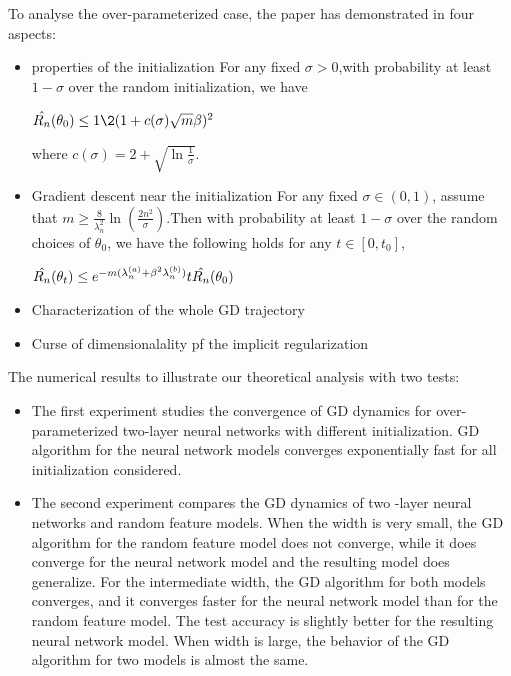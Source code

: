 \documentclass{article}
\begin{document}
To analyse the over-parameterized case, the paper has demonstrated in four aspects:
\begin{itemize}
\item properties of the initialization 
For any fixed $\sigma > 0$,with probability at least $1-\sigma$ over the random initialization, we have
    \begin{center}
      $\Hat{R_n}(\theta_0)\leq {1\2}(1+c(\sigma)\sqrt{m}\beta)^2$
    \end{center}
where $c(\sigma) = 2+\sqrt{\ln{\frac{1}{\sigma}}}$.

\item Gradient descent near the initialization 
For any fixed $\sigma \in (0,1)$, assume that $m \geq \frac{8}{\lambda_n^2}\ln(\frac{2n^2}{\sigma})$.Then with probability at least $1-\sigma$ over the random choices of $\theta_0$, we have the following holds for any $t\in[0,t_0]$,
    \begin{center}
      $\Hat{R_n}(\theta_t)\leq e^{-m(\lambda_n^{(a)}+\beta^2\lambda_n^{(b)})}t\Hat{R_n}(\theta_0)$
    \end{center}
    
\item Characterization of the whole GD trajectory
\item Curse of dimensionalality pf the implicit regularization
\end{itemize}

The numerical results to illustrate our theoretical analysis with two tests: 
\begin{itemize}
\item The first experiment studies the convergence of GD dynamics for over-parameterized two-layer neural networks with different initialization. GD algorithm for the neural network models converges exponentially fast for all initialization considered.
\item The second experiment compares the GD dynamics of two -layer neural networks and random feature models. When the width is very small, the GD algorithm for the random feature model does not converge, while it does converge for the neural network model and the resulting model does generalize. For the intermediate width, the GD algorithm for both models converges, and it converges faster for the neural network model than for the random feature model. The test accuracy is slightly better for the resulting neural network model. When width is large, the behavior of the GD algorithm for two models is almost the same. 
\end{itemize}
\end{document}

